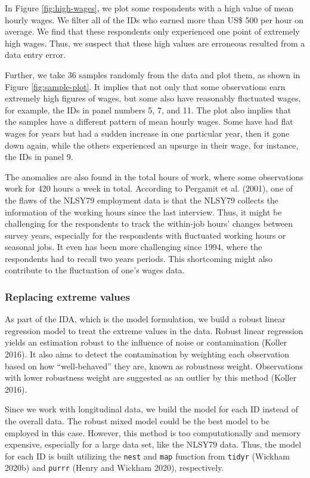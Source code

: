 \documentclass{article}
\begin{document}
In Figure \ref{fig:high-wages}, we plot some respondents with a high value of mean hourly wages. We filter all of the IDs who earned more than US\$ 500 per hour on average. We find that these respondents only experienced one point of extremely high wages. Thus, we suspect that these high values are erroneous resulted from a data entry error.

Further, we take 36 samples randomly from the data and plot them, as shown in Figure \ref{fig:sample-plot}. It implies that not only that some observations earn extremely high figures of wages, but some also have reasonably fluctuated wages, for example, the IDs in panel numbers 5, 7, and 11. The plot also implies that the samples have a different pattern of mean hourly wages. Some have had flat wages for years but had a sudden increase in one particular year, then it gone down again, while the others experienced an upsurge in their wage, for instance, the IDs in panel 9.

The anomalies are also found in the total hours of work, where some observations work for 420 hours a week in total. According to Pergamit et al. (2001), one of the flaws of the NLSY79 employment data is that the NLSY79 collects the information of the working hours since the last interview. Thus, it might be challenging for the respondents to track the within-job hours' changes between survey years, especially for the respondents with fluctuated working hours or seasonal jobs. It even has been more challenging since 1994, where the respondents had to recall two years periods. This shortcoming might also contribute to the fluctuation of one's wages data.

\hypertarget{replacing-extreme-values}{%
\subsubsection{Replacing extreme values}\label{replacing-extreme-values}}

As part of the IDA, which is the model formulation, we build a robust linear regression model to treat the extreme values in the data. Robust linear regression yields an estimation robust to the influence of noise or contamination (Koller 2016). It also aims to detect the contamination by weighting each observation based on how ``well-behaved'' they are, known as robustness weight. Observations with lower robustness weight are suggested as an outlier by this method (Koller 2016).

Since we work with longitudinal data, we build the model for each ID instead of the overall data. The robust mixed model could be the best model to be employed in this case. However, this method is too computationally and memory expensive, especially for a large data set, like the NLSY79 data. Thus, the model for each ID is built utilizing the \texttt{nest} and \texttt{map} function from \texttt{tidyr} (Wickham 2020b) and \texttt{purrr} (Henry and Wickham 2020), respectively.
\end{document}
